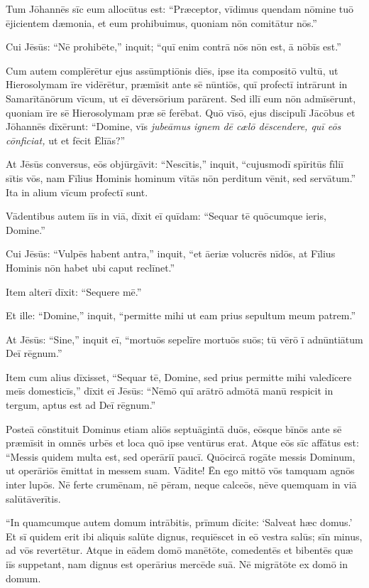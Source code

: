 \Versus Tum Jōhannēs sīc eum allocūtus est: ``Præceptor, vīdimus quendam nōmine tuō ējicientem dæmonia, et eum prohibuimus, quoniam nōn comitātur nōs.''

\Versus Cui Jēsūs: ``Nē prohibēte,'' inquit; ``quī enim contrā nōs nōn est, ā nōbīs est.''

\Versus Cum autem complērētur ejus assūmptiōnis diēs, ipse ita compositō vultū, ut Hierosolymam īre vidērētur,
\Versus præmīsit ante sē nūntiōs, quī profectī intrārunt in Samarītānōrum vīcum, ut eī dēversōrium parārent.
\Versus Sed illī eum nōn admīsērunt, quoniam īre sē Hierosolymam præ sē ferēbat.
\Versus Quō vīsō, ejus discipulī Jācōbus et Jōhannēs dīxērunt: ``Domine, vīs \emph{jubeāmus ignem dē cælō dēscendere, quī eōs cōnficiat,} ut et fēcit Ēlīās?''

\Versus At Jēsūs conversus, eōs objūrgāvit: ``Nescītis,'' inquit, ``cujusmodī spīritūs fīliī sītis vōs,
\Versus nam Fīlius Hominis hominum vītās nōn perditum vēnit, sed servātum.'' Ita in alium vīcum profectī sunt.

\Versus Vādentibus autem iīs in viā, dīxit eī quīdam: ``Sequar tē quōcumque ieris, Domine.''

\Versus Cui Jēsūs: ``Vulpēs habent antra,'' inquit, ``et āeriæ volucrēs nīdōs, at Fīlius Hominis nōn habet ubi caput reclīnet.''

\Versus Item alterī dīxit: ``Sequere mē.''

Et ille: ``Domine,'' inquit, ``permitte mihi ut eam prius sepultum meum patrem.''

\Versus At Jēsūs: ``Sine,'' inquit eī, ``mortuōs sepelīre mortuōs suōs; tū vērō ī adnūntiātum Deī rēgnum.''

\Versus Item cum alius dīxisset, ``Sequar tē, Domine, sed prius permitte mihi valedīcere meīs domesticīs,''
\Versus dīxit eī Jēsūs: ``Nēmō quī arātrō admōtā manū respicit in tergum, aptus est ad Deī rēgnum.''


\Caput
\Versus Posteā cōnstituit Dominus etiam aliōs septuāgintā duōs, eōsque bīnōs ante sē præmīsit in omnēs urbēs et loca quō ipse ventūrus erat.
\Versus Atque eōs sīc affātus est: ``Messis quidem multa est, sed operāriī paucī. Quōcircā rogāte messis Dominum, ut operāriōs ēmittat in messem suam.
\Versus Vādite! Ēn ego mittō vōs tamquam agnōs inter lupōs.
\Versus Nē ferte crumēnam, nē pēram, neque calceōs, nēve quemquam in viā salūtāverītis.

\Versus ``In quamcumque autem domum intrābitis, prīmum dīcite: `Salveat hæc domus.'
\Versus Et sī quidem erit ibi aliquis salūte dignus, requiēscet in eō vestra salūs; sīn minus, ad vōs revertētur.
\Versus Atque in eādem domō manētōte, comedentēs et bibentēs quæ iīs suppetant, nam dignus est operārius mercēde suā. Nē migrātōte ex domō in domum.

